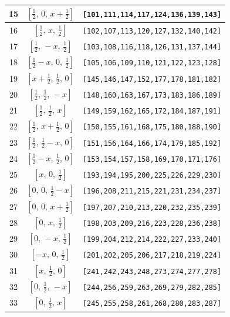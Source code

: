 \documentclass[fleqn,8pt]{jsarticle}
\begin{document}
\begin{longtable}{ccc}
15 & $\left[ \frac{1}{2},\, 0,\, x + \frac{1}{2} \right]$ & {\tt [101,111,114,117,124,136,139,143]} \\ \hline
16 & $\left[ \frac{1}{2},\, x,\, \frac{1}{2} \right]$ & {\tt [102,107,113,120,127,132,140,142]} \\ \hline
17 & $\left[ \frac{1}{2},\, - x,\, \frac{1}{2} \right]$ & {\tt [103,108,116,118,126,131,137,144]} \\ \hline
18 & $\left[ \frac{1}{2} - x,\, 0,\, \frac{1}{2} \right]$ & {\tt [105,106,109,110,121,122,123,128]} \\ \hline
19 & $\left[ x + \frac{1}{2},\, \frac{1}{2},\, 0 \right]$ & {\tt [145,146,147,152,177,178,181,182]} \\ \hline
20 & $\left[ \frac{1}{2},\, \frac{1}{2},\, - x \right]$ & {\tt [148,160,163,167,173,183,186,189]} \\ \hline
21 & $\left[ \frac{1}{2},\, \frac{1}{2},\, x \right]$ & {\tt [149,159,162,165,172,184,187,191]} \\ \hline
22 & $\left[ \frac{1}{2},\, x + \frac{1}{2},\, 0 \right]$ & {\tt [150,155,161,168,175,180,188,190]} \\ \hline
23 & $\left[ \frac{1}{2},\, \frac{1}{2} - x,\, 0 \right]$ & {\tt [151,156,164,166,174,179,185,192]} \\ \hline
24 & $\left[ \frac{1}{2} - x,\, \frac{1}{2},\, 0 \right]$ & {\tt [153,154,157,158,169,170,171,176]} \\ \hline
25 & $\left[ x,\, 0,\, \frac{1}{2} \right]$ & {\tt [193,194,195,200,225,226,229,230]} \\ \hline
26 & $\left[ 0,\, 0,\, \frac{1}{2} - x \right]$ & {\tt [196,208,211,215,221,231,234,237]} \\ \hline
27 & $\left[ 0,\, 0,\, x + \frac{1}{2} \right]$ & {\tt [197,207,210,213,220,232,235,239]} \\ \hline
28 & $\left[ 0,\, x,\, \frac{1}{2} \right]$ & {\tt [198,203,209,216,223,228,236,238]} \\ \hline
29 & $\left[ 0,\, - x,\, \frac{1}{2} \right]$ & {\tt [199,204,212,214,222,227,233,240]} \\ \hline
30 & $\left[ - x,\, 0,\, \frac{1}{2} \right]$ & {\tt [201,202,205,206,217,218,219,224]} \\ \hline
31 & $\left[ x,\, \frac{1}{2},\, 0 \right]$ & {\tt [241,242,243,248,273,274,277,278]} \\ \hline
32 & $\left[ 0,\, \frac{1}{2},\, - x \right]$ & {\tt [244,256,259,263,269,279,282,285]} \\ \hline
33 & $\left[ 0,\, \frac{1}{2},\, x \right]$ & {\tt [245,255,258,261,268,280,283,287]} \\ \hline

\end{longtable}
\end{document}
